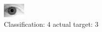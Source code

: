 \begin{figure}[h!]
\begin{center}
\includegraphics[width=0.60\columnwidth]{figures/ID2146_class_4_target_3.png}
\end{center}
\caption{ Classification: 4 actual target: 3}
\label{fig:ID2146_class_4_target_3}
\end{figure}
